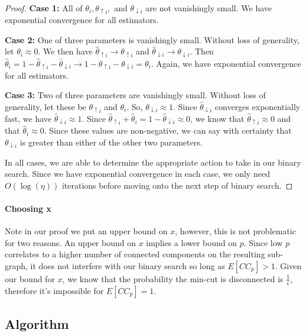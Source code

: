 \documentclass{article}
\begin{document}
\begin{proof}
\textbf{Case 1:} All of $\theta_i, \theta_{\uparrow i},$ and $\theta_{\downarrow i}$ are not vanishingly small. We have exponential convergence for all estimators.

\textbf{Case 2:} One of three parameters is vanishingly small. Without loss of generality, let $\theta_i \approx 0$. We then have $\hat{\theta}_{\uparrow i} \to \theta_{\uparrow i}$ and $\hat{\theta}_{\downarrow i} \to \theta_{\downarrow i}$. Then $\hat{\theta}_i = 1 - \hat{\theta}_{\uparrow i} - \hat{\theta}_{\downarrow i} \to 1 - \theta_{\uparrow i} - \theta_{\downarrow i} = \theta_i$. Again, we have exponential convergence for all estimators.

\textbf{Case 3:} Two of three parameters are vanishingly small. Without loss of generality, let these be $\theta_{\uparrow i}$ and $\theta_{i}$. So, $\theta_{\downarrow i} \approx 1$. Since $\hat{\theta}_{\downarrow i}$ converges exponentially fast, we have $\hat{\theta}_{\downarrow i} \approx 1$. Since $\hat{\theta}_{\uparrow i} + \hat{\theta}_i = 1 - \hat{\theta}_{\downarrow i} \approx 0$, we know that $\hat{\theta}_{\uparrow i} \approx 0$ and that $\hat{\theta}_{i} \approx 0$. Since these values are non-negative, we can say with certainty that $\theta_{\downarrow i}$ is greater than either of the other two parameters.

In all cases, we are able to determine the appropriate action to take in our binary search. Since we have exponential convergence in each case, we only need $O(\log(\eta))$ iterations before moving onto the next step of binary search.
\end{proof}

\paragraph{Choosing x}

Note in our proof we put an upper bound on $x$, however, this is not problematic for two reasons. An upper bound on $x$ implies a lower bound on $p$. Since low $p$ correlates to a higher number of connected components on the resulting sub-graph, it does not interfere with our binary search so long as $E[CC_p] > 1$. Given our bound for $x$, we know that the probability the min-cut is disconnected is $\frac{1}{\epsilon}$, therefore it's impossible for $E[CC_p] = 1$.

\subsection{Algorithm}
\end{document}
